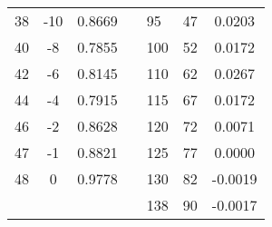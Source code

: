 \begin{table}[!htb]
\begin{tabular}{cccl|l|l|c|}
\multicolumn{1}{|c|}{38} & \multicolumn{1}{c|}{-10} & \multicolumn{1}{c|}{0.8669} &  & 95 & 47 & 0.0203 \\ \cline{1-3} \cline{5-7} 
\multicolumn{1}{|c|}{40} & \multicolumn{1}{c|}{-8} & \multicolumn{1}{c|}{0.7855} &  & 100 & 52 & 0.0172 \\ \cline{1-3} \cline{5-7} 
\multicolumn{1}{|c|}{42} & \multicolumn{1}{c|}{-6} & \multicolumn{1}{c|}{0.8145} &  & 110 & 62 & 0.0267 \\ \cline{1-3} \cline{5-7} 
\multicolumn{1}{|c|}{44} & \multicolumn{1}{c|}{-4} & \multicolumn{1}{c|}{0.7915} &  & 115 & 67 & 0.0172 \\ \cline{1-3} \cline{5-7} 
\multicolumn{1}{|c|}{46} & \multicolumn{1}{c|}{-2} & \multicolumn{1}{c|}{0.8628} &  & 120 & 72 & 0.0071 \\ \cline{1-3} \cline{5-7} 
\multicolumn{1}{|c|}{47} & \multicolumn{1}{c|}{-1} & \multicolumn{1}{c|}{0.8821} &  & 125 & 77 & 0.0000 \\ \cline{1-3} \cline{5-7} 
\multicolumn{1}{|c|}{48} & \multicolumn{1}{c|}{0} & \multicolumn{1}{c|}{0.9778} &  & 130 & 82 & -0.0019 \\ \cline{1-3} \cline{5-7} 
 &  &  &  & 138 & 90 & -0.0017 \\ \cline{5-7} 
\end{tabular}
\end{table}